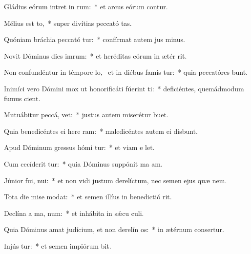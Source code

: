 \item Gládius eórum intret in  rum:~* et arcus eórum contur.
\item Mélius est  to,~* super divítias peccató tas.
\item Quóniam bráchia peccató tur:~* confírmat autem jus minus.
\item Novit Dóminus dies imrum:~* et heréditas eórum in ætér rit.
\item Non confundéntur in témpore lo,~\pscross{} et in diébus famis tur:~* quia peccatóres bunt.
\item Inimíci vero Dómini mox ut honorificáti fúerint  ti:~* deficiéntes, quemádmodum fumus cient.
\item Mutuábitur peccá,   vet:~* justus autem miserétur  buet.
\item Quia benedicéntes ei here ram:~* maledicéntes autem ei disbunt.
\item Apud Dóminum gressus hómi tur:~* et viam e let.
\item Cum cecíderit  tur:~* quia Dóminus suppónit ma am.
\item Júnior fui,  nui:~* et non vidi justum derelíctum, nec semen ejus quæ nem.
\item Tota die mise  modat:~* et semen illíus in benedictió rit.
\item Declína a ma,   num:~* et inhábita in sǽcu culi.
\item Quia Dóminus amat judícium, et non derelín  os:~* in ætérnum consertur.
\item Injús tur:~* et semen impiórum bit.
